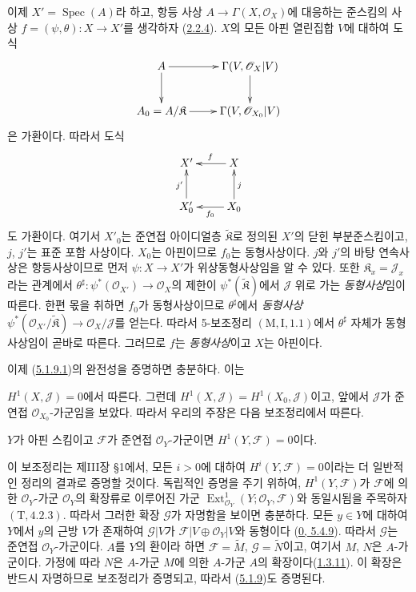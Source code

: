 이제 $X'=\operatorname{Spec}(A)$라 하고, 항등 사상
$A\to\Gamma(X,\mathscr{O}_X)$에 대응하는 준스킴의 사상
$f=(\psi,\theta):X\to X'$를 생각하자
(\hyperref[I.2.2.4-ko]{2.2.4}). $X$의 모든 아핀 열린집합 $V$에 대하여
도식
\[
  \xymatrix{
    A\ar[r]\ar[d] & \Gamma(V,\mathscr{O}_X|V)\ar[d]\\
    A_0=A/\mathfrak{K}\ar[r] & \Gamma(V,\mathscr{O}_{X_0}|V)
  }
\]
은 가환이다. 따라서 도식
\[
  \xymatrix{
    X' & X\ar[l]_f\\
    X'_0\ar[u]^{j'} & X_0\ar[l]^{f_0}\ar[u]_j
  }
\]
도 가환이다. 여기서 $X'_0$는 준연접 아이디얼층
$\widetilde{\mathfrak{K}}$로 정의된 $X'$의 닫힌 부분준스킴이고,
$j$, $j'$는 표준 포함 사상이다. $X_0$는 아핀이므로 $f_0$는
동형사상이다. $j$와 $j'$의 바탕 연속사상은 항등사상이므로 먼저
$\psi:X\to X'$가 위상동형사상임을 알 수 있다. 또한
$\mathfrak{K}_x=\mathscr{J}_x$라는 관계에서
$\theta^\sharp:\psi^*(\mathscr{O}_{X'})\to\mathscr{O}_X$의 제한이
$\psi^*(\widetilde{\mathfrak{K}})$에서 $\mathscr{J}$ 위로 가는
\emph{동형사상}임이 따른다. 한편 몫을 취하면 $f_0$가 동형사상이므로
$\theta^\sharp$에서 \emph{동형사상}
$\psi^*(\mathscr{O}_{X'}/\widetilde{\mathfrak{K}})
\to\mathscr{O}_X/\mathscr{J}$를 얻는다. 따라서 5-보조정리
$(\mathrm{M},\mathrm{I},1.1)$에서 $\theta^\sharp$ 자체가
동형사상임이 곧바로 따른다. 그러므로 $f$는 \emph{동형사상}이고
$X$는 아핀이다.

이제 (\hyperref[I.5.1.9.1-ko]{5.1.9.1})의 완전성을 증명하면
충분하다. 이는

$H^1(X,\mathscr{J})=0$에서 따른다. 그런데
$H^1(X,\mathscr{J})=H^1(X_0,\mathscr{J})$이고, 앞에서
$\mathscr{J}$가 준연접 $\mathscr{O}_{X_0}$-가군임을 보았다. 따라서
우리의 주장은 다음 보조정리에서 따른다.

\begin{lemma}[5.1.9.2]
\label{I.5.1.9.2-ko}
$Y$가 아핀 스킴이고 $\mathscr{F}$가 준연접
$\mathscr{O}_Y$-가군이면 $H^1(Y,\mathscr{F})=0$이다.
\end{lemma}

이 보조정리는 제III장 §1에서, 모든 $i>0$에 대하여
$H^i(Y,\mathscr{F})=0$이라는 더 일반적인 정리의 결과로 증명할
것이다. 독립적인 증명을 주기 위하여, $H^1(Y,\mathscr{F})$가
$\mathscr{F}$에 의한 $\mathscr{O}_Y$-가군 $\mathscr{O}_Y$의 확장류로
이루어진 가군
$\operatorname{Ext}^1_{\mathscr{O}_Y}
(Y;\mathscr{O}_Y,\mathscr{F})$와 동일시됨을 주목하자
$(\mathrm{T},4.2.3)$. 따라서 그러한 확장 $\mathscr{G}$가 자명함을
보이면 충분하다. 모든 $y\in Y$에 대하여 $Y$에서 $y$의 근방 $V$가
존재하여 $\mathscr{G}|V$가
$\mathscr{F}|V\oplus\mathscr{O}_Y|V$와 동형이다
(\hyperref[0.5.4.9-ko]{0, 5.4.9}). 따라서 $\mathscr{G}$는 준연접
$\mathscr{O}_Y$-가군이다. $A$를 $Y$의 환이라 하면
$\mathscr{F}=\widetilde{M}$, $\mathscr{G}=\widetilde{N}$이고, 여기서
$M$, $N$은 $A$-가군이다. 가정에 따라 $N$은 $A$-가군 $M$에 의한
$A$-가군 $A$의 확장이다(\hyperref[I.1.3.11-ko]{1.3.11}). 이 확장은
반드시 자명하므로 보조정리가 증명되고, 따라서
(\hyperref[I.5.1.9-ko]{5.1.9})도 증명된다.

